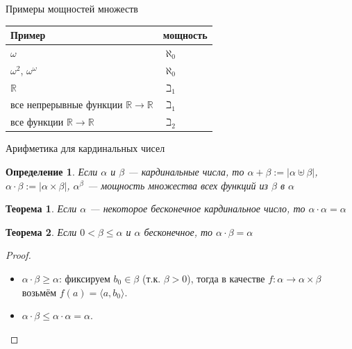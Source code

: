 \documentclass[aspectratio=169]{beamer}
\newtheorem{thm}{Теорема}[section]
\newtheorem{dfn}{Определение}[section]
\newcommand{\divisible}%
{\mathrel{\lower.2ex%
\vbox{\baselineskip=0.7ex\lineskiplimit=0pt%
\kern6pt \hbox{.}\hbox{.}\hbox{.}}%
}}
\begin{document}
\begin{frame}{Примеры мощностей множеств}
\begin{center}\begin{tabular}{l|l}Пример & мощность\\\hline
$\omega$ & $\aleph_0$\\
$\omega^2$, $\omega^\omega$ & $\aleph_0$\\
$\mathbb{R}$ & $\beth_1$\\
все непрерывные функции $\mathbb{R}\rightarrow\mathbb{R}$ & $\beth_1$\\
все функции $\mathbb{R}\rightarrow\mathbb{R}$ & $\beth_2$
\end{tabular}\end{center}

\end{frame}




\begin{frame}{Арифметика для кардинальных чисел}
\begin{dfn}Если $\alpha$ и $\beta$ --- кардинальные числа, то 
$\alpha + \beta := |\alpha\uplus\beta|$,
$\alpha \cdot \beta := |\alpha \times \beta|$, 
$\alpha ^\beta$ --- мощность множества всех функций из $\beta$ в $\alpha$\end{dfn}

\begin{thm}Если $\alpha$ --- некоторое бесконечное кардинальное число, то $\alpha\cdot\alpha = \alpha$\end{thm}

\begin{thm}Если $0 < \beta \le \alpha$ и $\alpha$ бесконечное, то $\alpha\cdot\beta = \alpha$\end{thm}
\begin{proof}
\begin{itemize}
\item $\alpha \cdot \beta \ge \alpha$:
фиксируем $b_0 \in \beta$ (т.к. $\beta > 0$), тогда
в качестве $f : \alpha \rightarrow \alpha \times \beta$ возьмём $f(a) = \langle a,b_0\rangle$.
\item $\alpha \cdot \beta \le \alpha \cdot \alpha = \alpha$.
\end{itemize}
\end{proof}\vspace{0.5cm}
\end{frame}
\end{document}
